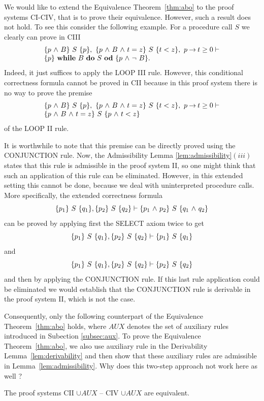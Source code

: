 \documentclass[manuscript, screen, review]{acmart}
\newcommand{\AUX}{\mathit{AUX}}
\begin{document}
We would like to extend the Equivalence Theorem~\ref{thm:abo} to the
proof systems CI-CIV, that is to prove their equivalence.  However,
such a result does not hold.  To see this consider the following
example.  For a procedure call $S$ we clearly can prove in CIII
\[
  \begin{array}{l}
    \mbox{$\{{p \mbox{$\ \wedge\ $} B}\}\ {S}\ \{{p}\}$}, \ \mbox{$\{{p \mbox{$\ \wedge\ $} B \mbox{$\ \wedge\ $} t=z}\}\ {S}\ \{{t<z}\}$}, \ p \mbox{$\:\rightarrow\:$} t \geq 0 \vdash \\
    \mbox{$\{{p}\}\ {\mbox{$\mbox{{\bf while}\ } {B}\ \mbox{{\bf do}\ } {S}\ \mbox{{\bf od}}$}}\ \{{p \mbox{$\ \wedge\ $} \neg\ B}\}$}.
  \end{array}
\]
Indeed, it just suffices to apply the LOOP III rule.
However, this conditional correctness formula cannot be proved in CII
because in this proof system there is no way to prove the premise
\[
  \begin{array}{l}  
    \mbox{$\{{p \mbox{$\ \wedge\ $} B}\}\ {S}\ \{{p}\}$}, \ \mbox{$\{{p \mbox{$\ \wedge\ $} B \mbox{$\ \wedge\ $} t=z}\}\ {S}\ \{{t<z}\}$}, \ p \mbox{$\:\rightarrow\:$} t \geq 0 \vdash  \\
    \mbox{$\{{p \mbox{$\ \wedge\ $} B \mbox{$\ \wedge\ $} t=z}\}\ {S}\ \{{p \mbox{$\ \wedge\ $} t<z}\}$}
  \end{array}    
\]
of the LOOP II rule.

It is worthwhile to note that this premise can be directly proved
using the CONJUNCTION rule.  Now, the Admissibility Lemma
\ref{lem:admissibility}$(iii)$ states that this rule is admissible in
the proof system II, so one might think that such an application of
this rule can be eliminated.  However, in this extended setting this
cannot be done, because we deal with uninterpreted procedure calls.
More specifically, the extended correctness formula
\[
  \mbox{$\{{p_1}\}\ {S}\ \{{q_1}\}$}, \mbox{$\{{p_2}\}\ {S}\ \{{q_2}\}$}  \vdash \mbox{$\{{p_1 \mbox{$\ \wedge\ $} p_2}\}\ {S}\ \{{q_1 \mbox{$\ \wedge\ $} q_2}\}$}         
\]
can be proved by applying first the SELECT axiom twice to get 
\[
  \mbox{$\{{p_1}\}\ {S}\ \{{q_1}\}$}, \mbox{$\{{p_2}\}\ {S}\ \{{q_2}\}$}  \vdash \mbox{$\{{p_1}\}\ {S}\ \{{q_1}\}$} 
\]
and
\[
  \mbox{$\{{p_1}\}\ {S}\ \{{q_1}\}$}, \mbox{$\{{p_2}\}\ {S}\ \{{q_2}\}$}  \vdash \mbox{$\{{p_2}\}\ {S}\ \{{q_2}\}$}
\]
and then by applying the CONJUNCTION rule.  If this last rule
application could be eliminated we would establish that the
CONJUNCTION rule is derivable in the proof system II, which is not the
case.

Consequently, only the following counterpart of the Equivalence Theorem~\ref{thm:abo}
holds, where $\AUX$ denotes the set of auxiliary rules introduced in Subection \ref{subsec:aux}.
To prove the Equivalence
Theorem~\ref{thm:abo}, we also use auxiliary rule in the Derivability
Lemma~\ref{lem:derivability} and then show that these auxiliary rules
are admissible in Lemma~\ref{lem:admissibility}.  Why does this
two-step approach not work here as well ?

\begin{theorem} \label{thm:main2}
  The proof systems CII $\cup \AUX$ -- CIV $\cup \AUX$  are equivalent.  
\end{theorem}
\end{document}
